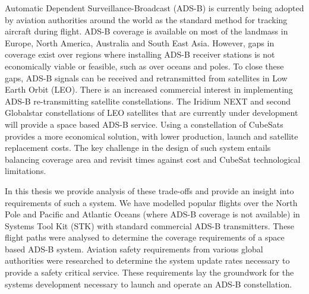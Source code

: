 Automatic Dependent Surveillance-Broadcast (ADS-B) is currently being adopted by aviation authorities around the world as the standard method for tracking aircraft during flight. ADS-B coverage is available on most of the landmass in Europe, North America, Australia and South East Asia. However, gaps in coverage exist over regions where installing ADS-B receiver stations is not economically viable or feasible, such as over oceans and poles. To close these gaps, ADS-B signals can be received and retransmitted from satellites in Low Earth Orbit (LEO). There is an increased commercial interest in  implementing ADS-B re-transmitting satellite constellations. The Iridium NEXT and second Globalstar constellations of LEO satellites that are currently  under development will provide a space based ADS-B service. Using a constellation of CubeSats provides a more economical solution, with lower production, launch and satellite replacement costs. The key challenge in the design of such system entails balancing coverage area and revisit times against cost and CubeSat technological limitations.


In this thesis we provide analysis of these trade-offs and provide an insight into requirements of such a system. We have modelled popular flights over the North Pole and Pacific and Atlantic Oceans (where ADS-B coverage is not available) in Systems Tool Kit (STK) with standard commercial ADS-B transmitters. These flight paths were analysed to determine the coverage requirements of a space based ADS-B system. Aviation safety requirements from various global authorities were researched to determine the system update rates necessary to provide a safety critical service. These requirements lay the groundwork for the systems development necessary to launch and operate an ADS-B constellation. 
